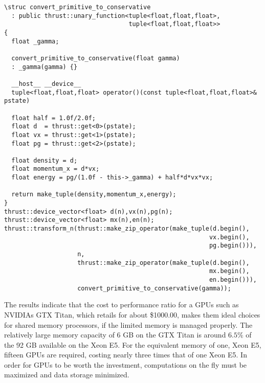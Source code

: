 \begin{lstlisting} 
\struc convert_primitive_to_conservative
  : public thrust::unary_function<tuple<float,float,float>,
                                  tuple<float,float,float>>
{
  float _gamma;
  
  convert_primitive_to_conservative(float gamma)
  : _gamma(gamma) {}

  __host__ __device__
  tuple<float,float,float> operator()(const tuple<float,float,float>& pstate)

  float half = 1.0f/2.0f;
  float d  = thrust::get<0>(pstate);
  float vx = thrust::get<1>(pstate);
  float pg = thrust::get<2>(pstate);

  float density = d;
  float momentum_x = d*vx;
  float energy = pg/(1.0f - this->_gamma) + half*d*vx*vx;
  
  return make_tuple(density,momentum_x,energy);
}
thrust::device_vector<float> d(n),vx(n),pg(n); 
thrust::device_vector<float> mx(n),en(n); 
thrust::transform_n(thrust::make_zip_operator(make_tuple(d.begin(),
                                                        vx.begin(),
                                                        pg.begin())),
                    n,
                    thrust::make_zip_operator(make_tuple(d.begin(),
                                                        mx.begin(),
                                                        en.begin())),
                    convert_primitive_to_conservative(gamma));
\end{lstlisting} 

 The results indicate that the cost to performance ratio for a  GPUs such as NVIDIAs GTX Titan, which retails for about \$1000.00, makes them ideal choices for shared memory processors, if the limited memory is managed properly.  The relatively large memory capacity of 6 GB on the GTX Titan is around $6.5\%$ of the 92 GB available on the Xeon E5.  For the equivalent memory of one, Xeon E5, fifteen GPUs are required, costing nearly three times that of one Xeon E5.  In order for GPUs to be worth the investment, computations on the fly must be maximized and data storage minimized.   


